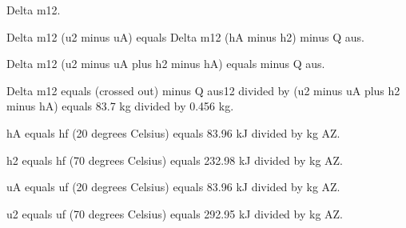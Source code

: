 Delta m12.

Delta m12 (u2 minus uA) equals Delta m12 (hA minus h2) minus Q aus.

Delta m12 (u2 minus uA plus h2 minus hA) equals minus Q aus.

Delta m12 equals (crossed out) minus Q aus12 divided by (u2 minus uA plus h2 minus hA) equals 83.7 kg divided by 0.456 kg.

hA equals hf (20 degrees Celsius) equals 83.96 kJ divided by kg AZ.

h2 equals hf (70 degrees Celsius) equals 232.98 kJ divided by kg AZ.

uA equals uf (20 degrees Celsius) equals 83.96 kJ divided by kg AZ.

u2 equals uf (70 degrees Celsius) equals 292.95 kJ divided by kg AZ.